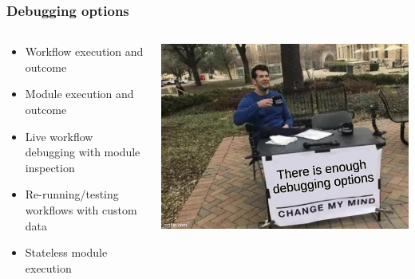 \begin{frame}
    \frametitle{Debugging options}
    \begin{columns}
        \begin{column}{0.6\textwidth}
            \begin{itemize}
                \item Workflow execution and outcome
                \item Module execution and outcome
                \item Live workflow debugging with module inspection
                \item Re-running/testing workflows with custom data
                \item Stateless module execution
            \end{itemize}
        \end{column}
        \begin{column}{0.4\textwidth}
            \includegraphics[width=1.0\linewidth]{pictures/enough-debugging.jpg}
        \end{column}
    \end{columns}
\end{frame}

